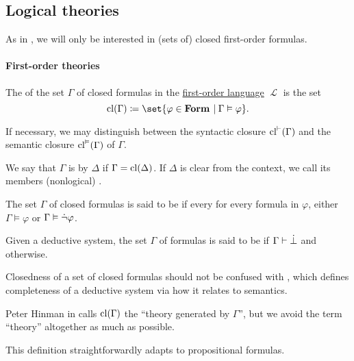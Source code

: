 \subsection{Logical theories}\label{subsec:logical_theories}

As in , we will only be interested in (sets of) closed first-order formulas.

\paragraph{First-order theories}

\begin{definition}\label{def:first_order_theory}
  The  of the set \( \Gamma \) of closed formulas in the \hyperref[def:first_order_language]{first-order language} \( \mscrL \) is the set
  \begin{equation*}
    \cl(\Gamma) \coloneqq \set{ \varphi \in \op*{Form} \given \Gamma \vDash \varphi }.
  \end{equation*}

  If necessary, we may distinguish between the syntactic closure \( \operatorname{cl}^\vdash(\Gamma) \) and the semantic closure \( \operatorname{cl}^\vDash(\Gamma) \) of \( \Gamma \).

  \begin{thmenum}
     We say that \( \Gamma \) is  by \( \Delta \) if \( \Gamma = \operatorname{cl}(\Delta) \). If \( \Delta \) is clear from the context, we call its members (nonlogical) .

    \medskip

     The set \( \Gamma \) of closed formulas is said to be  if every for every formula in \( \varphi \), either \( \Gamma \vDash \varphi \) or \( \Gamma \vDash \dot\neg \varphi \).

     Given a deductive system, the set \( \Gamma \) of formulas is said to be  if \( \Gamma \vdash \dot\bot \) and  otherwise.
  \end{thmenum}
\end{definition}
\begin{comments}
  \item Closedness of a set of closed formulas should not be confused with , which defines completeness of a deductive system via how it relates to semantics.

  \item Peter Hinman in  calls \( \operatorname{cl}(\Gamma) \) the \enquote{theory generated by \( \Gamma \)}, but we avoid the term \enquote{theory} altogether as much as possible.

  \item This definition straightforwardly adapts to propositional formulas.
\end{comments}

